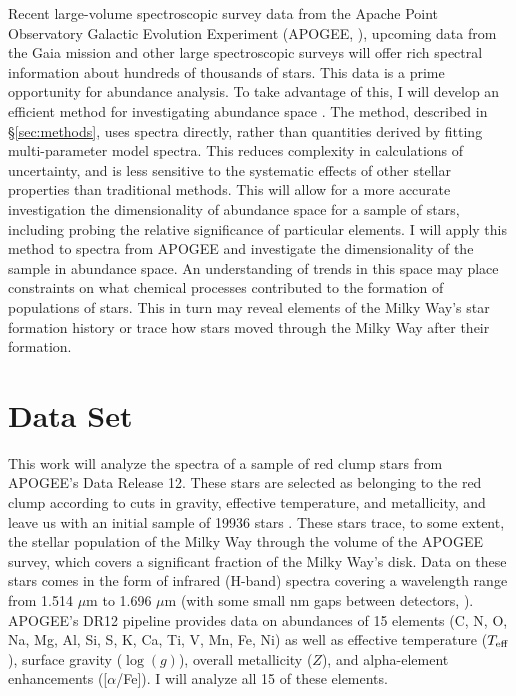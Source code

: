 \documentclass[preprint]{aastex}
\begin{document}
Recent large-volume spectroscopic survey data from the Apache Point Observatory Galactic Evolution Experiment (APOGEE, \citealt{APOGEE}), upcoming data from the Gaia mission \citep{GAIA} and other large spectroscopic surveys will offer rich spectral information about hundreds of thousands of stars. This data is a prime opportunity for abundance analysis. To take advantage of this, I will develop an efficient method for investigating abundance space \citep{openclusters}. The method, described in \S\ref{sec:methods}, uses spectra directly, rather than quantities derived by fitting multi-parameter model spectra. This reduces complexity in calculations of uncertainty, and is less sensitive to the systematic effects of other stellar properties than traditional methods. This will allow for a more accurate investigation the dimensionality of abundance space for a sample of stars, including probing the relative significance of particular elements. I will apply this method to spectra from APOGEE and investigate the dimensionality of the sample in abundance space. An understanding of trends in this space may place constraints on what chemical processes contributed to the formation of populations of stars. This in turn may reveal elements of the Milky Way's star formation history or trace how stars moved through the Milky Way after their formation.


\section{Data Set}
\label{sec:data}
This work will analyze the spectra of a sample of red clump stars from APOGEE's Data Release 12. These stars are selected as belonging to the red clump according to cuts in gravity, effective temperature, and metallicity, and leave us with an initial sample of 19936 stars \citep{bovy2014}. These stars trace, to some extent, the stellar population of the Milky Way through the volume of the APOGEE survey, which covers a significant fraction of the Milky Way’s disk. Data on these stars comes in the form of infrared (H-band) spectra covering a wavelength range from 1.514 $\mu$m to 1.696 $\mu$m (with some small nm gaps between detectors, \citealt{APOGEE}). APOGEE's DR12 pipeline provides data on abundances of 15 elements (C, N, O, Na, Mg, Al, Si, S, K, Ca, Ti, V, Mn, Fe, Ni) as well as effective temperature ($T_{\rm eff}$), surface gravity ($\log(g)$), overall metallicity ($Z$), and alpha-element enhancements ([$\alpha$/Fe])\citep{holtzman2015}. I will analyze all 15 of these elements.
\end{document}
